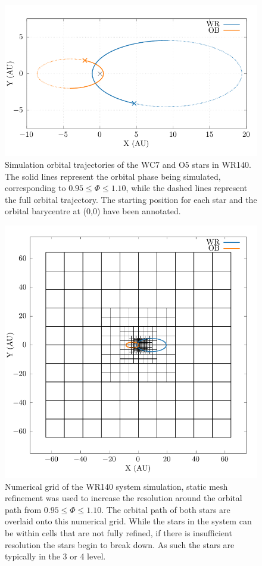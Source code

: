 \begin{figure}
  \centering
  \includegraphics{assets/trajectory/wr140-orbit.pdf}
  \caption[Simulation orbital trajectories of WR140 WC7 and O5 stars]{Simulation orbital trajectories of the WC7 and O5 stars in WR140. The solid lines represent the orbital phase being simulated, corresponding to $0.95 \leq \Phi \leq 1.10$, while the dashed lines represent the full orbital trajectory. The starting position for each star and the orbital barycentre at (0,0) have been annotated.}
  \label{fig:p2-trajectory}
\end{figure}

\begin{figure}
  \centering
  \includegraphics{assets/wr140-grid/grid-orbit.pdf}
  \caption{Numerical grid of the WR140 system simulation, static mesh refinement was used to increase the resolution around the orbital path from $0.95 \leq \Phi \leq 1.10$. The orbital path of both stars are overlaid onto this numerical grid. While the stars in the system can be within cells that are not fully refined, if there is insufficient resolution the stars begin to break down. As such the stars are typically in the 3 or 4 level.}
  \label{fig:p2-orbitalpath}
\end{figure}


